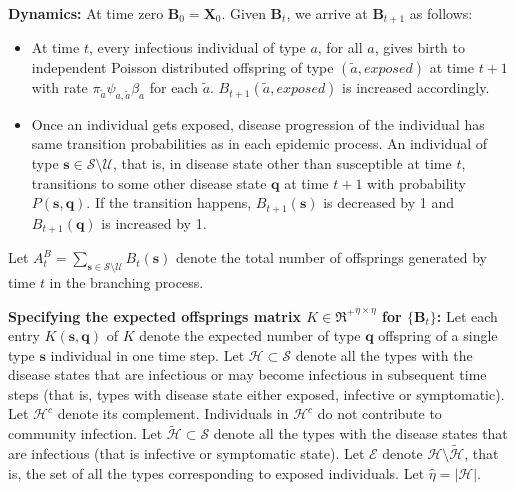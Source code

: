 \documentclass{article}
\theoremstyle{definition}
\newcommand{\abs}[1]{\left\lvert{#1}\right\rvert}
\begin{document}
\noindent \textbf{Dynamics:} At time zero ${\bm{B}_0} = {\bm{X}_0}$. Given ${\bm {B}_t}$, we arrive at ${\bm {B}_{t+1}}$ as follows: 
 \begin{itemize}
     \item
At time $t$, every infectious individual of type $a$, for all $a$,  gives birth to independent Poisson distributed 
offspring of   type $(\tilde{a},exposed)$ at time $t+1$  with rate $\pi_{\tilde{a}}\psi_{a, \tilde{a}} \beta_{a}$
for each $\tilde{a}$. $B_{t+1}(\tilde{a},exposed)$ is increased accordingly.
\item
Once an individual gets exposed, disease 
progression of the individual has same transition probabilities as in each epidemic process.   An individual of type
 $\bm{s} \in \mathcal S \setminus \mathcal U$, that is, in disease state other than susceptible at time $t$, transitions to some other disease state $\bm{q}$ at time $t+1$ with probability $P(\bm{s},\bm{q})$. If the transition happens, $B_{t+1}(\bm{s})$ is decreased by 1 and $B_{t+1}(\bm{q})$ is increased by 1.     
 \end{itemize}
 
 Let $A_t^B = \sum_{\bm{s}\in\mathcal S \setminus \mathcal U  } B_t(\bm{s})$ denote the  total number of offsprings generated
   by time $t$ in the branching process.  

 
 
\noindent \textbf{Specifying the expected offsprings matrix  $K\in {\Re^+}^{\eta \times \eta}$ for $\{{\bm{B}_t}\}$:} Let
each entry  ${K}(\bm{s},\bm{q})$ of $K$ denote the expected number of type $\bm{q}$  offspring of a single type $\bm{s}$ individual in one time step.
 Let $\mathcal{H} \subset \mathcal S$  denote all the types with the disease states that are infectious or may become infectious in subsequent time steps (that is, types with disease state either exposed, infective or symptomatic). Let $\mathcal H^c$ denote its complement. Individuals in
    $\mathcal H^c$ do not contribute to community infection.   Let ${\mathcal{\tilde{H}}} \subset \mathcal S$  denote all the types with  the disease states that are infectious (that is infective or symptomatic state). Let $\mathcal{E}$  denote $\mathcal{H}\setminus\mathcal{\tilde{H}}$, that  is, the set of all the types corresponding to exposed individuals.  Let $\hat{\eta} = \abs{\mathcal H}$. 

 
\end{document}
